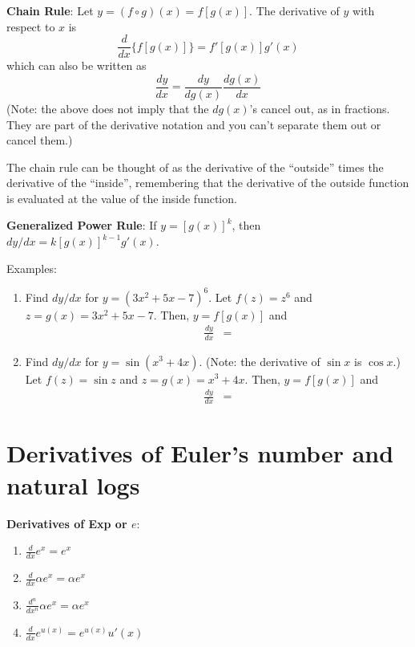 \documentclass[]{book}
\theoremstyle{definition}
\theoremstyle{definition}
\theoremstyle{definition}
\theoremstyle{remark}
\begin{document}
\textbf{Chain Rule}: Let \(y=(f\circ g)(x)= f[g(x)]\). The derivative of
\(y\) with respect to \(x\) is
\[\frac{d}{dx} \{ f[g(x)] \} = f'[g(x)] g'(x)\] which can also be
written as \[\frac{dy}{dx}=\frac{dy}{dg(x)} \frac{dg(x)}{dx}\] (Note:
the above does not imply that the \(dg(x)\)'s cancel out, as in
fractions. They are part of the derivative notation and you can't
separate them out or cancel them.)

The chain rule can be thought of as the derivative of the ``outside''
times the derivative of the ``inside'', remembering that the derivative
of the outside function is evaluated at the value of the inside
function.

\textbf{Generalized Power Rule}: If \(y=[g(x)]^k\), then
\(dy/dx=k[g(x)]^{k-1}g'(x)\).

\begin{framed}
Examples:
\begin{enumerate}
        \item Find $dy/dx$ for $y=(3x^2+5x-7)^6$. Let $f(z)=z^6$ and $z=g(x)=3x^2+5x-7$.  Then, $y=f[g(x)]$ and
        \begin{eqnarray*}
            \frac{dy}{dx}&=
        \end{eqnarray*}
        
        \item Find $dy/dx$ for $y=\sin(x^3+4x)$. (Note: the derivative of $\sin x$ is $\cos x$.)  Let $f(z)=\sin z$ and $z=g(x)=x^3+4x$.  Then, $y=f[g(x)]$ and
        \begin{eqnarray*}
            \frac{dy}{dx}&=
        \end{eqnarray*}
\end{enumerate}
\end{framed}

\section{Derivatives of Euler's number and natural
logs}\label{derivatives-of-eulers-number-and-natural-logs}

\textbf{Derivatives of Exp or \(e\)}:

\begin{enumerate}
        \item $\frac{d}{dx}e^x = e^x$
        \item $\frac{d}{dx}\alpha e^x = \alpha e^x$
        \item $\frac{d^n}{dx^n} \alpha e^x = \alpha e^x$
        \item $\frac{d}{dx}e^{u(x)}= e^{u(x)} u'(x)$
\end{enumerate}
\end{document}
